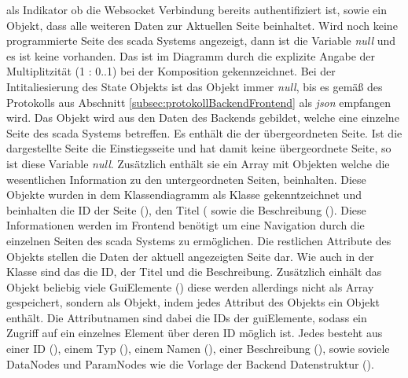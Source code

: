 als Indikator ob die Websocket Verbindung bereits authentifiziert ist, sowie ein  Objekt, dass alle weiteren Daten zur Aktuellen Seite beinhaltet.
Wird noch keine programmierte Seite des \ac{scada} Systems angezeigt, dann ist die Variable  \emph{null} und es ist keine  vorhanden.
Das ist im Diagramm durch die explizite Angabe der Multiplitzität (1 : 0..1) bei der Komposition gekennzeichnet.
Bei der Intitaliesierung des State Objekts ist das  Objekt immer \emph{null}, 
bis es gemäß des Protokolls aus Abschnitt \ref{subsec:protokollBackendFrontend} als \emph{json} empfangen wird.
Das  Objekt wird aus den Daten des Backends gebildet, welche eine einzelne Seite des \ac{scada} Systems betreffen.
Es enthält die  der übergeordneten Seite. 
Ist die dargestellte Seite die Einstiegsseite und hat damit keine übergeordnete Seite, so ist diese Variable \emph{null}.
Zusätzlich enthält sie ein Array mit Objekten welche die wesentlichen Information zu den untergeordneten Seiten, beinhalten.
Diese Objekte wurden in dem Klassendiagramm als  Klasse gekenntzeichnet und beinhalten die ID der Seite (), 
den Titel ( sowie die Beschreibung ().
Diese Informationen werden im Frontend benötigt um eine Navigation durch die einzelnen Seiten des \ac{scada} Systems zu ermöglichen.
Die restlichen Attribute des  Objekts stellen die Daten der aktuell angezeigten Seite dar.
Wie auch in der  Klasse sind das die ID, der Titel und die Beschreibung.
Zusätzlich einhält das  Objekt beliebig viele GuiElemente () diese werden allerdings nicht als Array gespeichert, sondern als Objekt, indem jedes Attribut des Objekts ein  Objekt enthält.
Die Attributnamen sind dabei die IDs der guiElemente, sodass ein Zugriff auf ein einzelnes Element über deren ID möglich ist.
Jedes  besteht aus einer ID (), einem Typ (), einem Namen (), 
einer Beschreibung (), sowie soviele DataNodes und ParamNodes wie die Vorlage der Backend Datenstruktur ().
 


